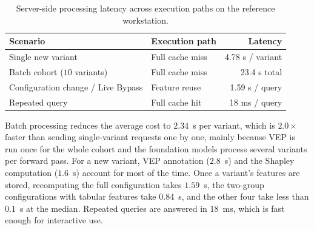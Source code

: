 \begin{table}[htbp]
    \centering
    \caption{Server-side processing latency across execution paths on the reference workstation.}
    \label{tab:latency_benchmarks}
    \begin{tabular}{llr}
        \toprule
        \textbf{Scenario} & \textbf{Execution path} & \textbf{Latency} \\
        \midrule
        Single new variant & Full cache miss & 4.78 s / variant \\
        Batch cohort ($10$ variants) & Full cache miss & 23.4 s total \\
        Configuration change / Live Bypass & Feature reuse & 1.59 s / query \\
        Repeated query & Full cache hit & 18 ms / query \\
        \bottomrule
    \end{tabular}
\end{table}

Batch processing reduces the average cost to $2.34$~s per variant, which is $2.0\times$ faster than sending single-variant requests one by one, mainly because VEP is run once for the whole cohort and the foundation models process several variants per forward pass. For a new variant, VEP annotation ($2.8$~s) and the Shapley computation ($1.6$~s) account for most of the time. Once a variant's features are stored, recomputing the full configuration takes $1.59$~s, the two-group configurations with tabular features take $0.84$~s, and the other four take less than $0.1$~s at the median. Repeated queries are answered in $18$~ms, which is fast enough for interactive use.
